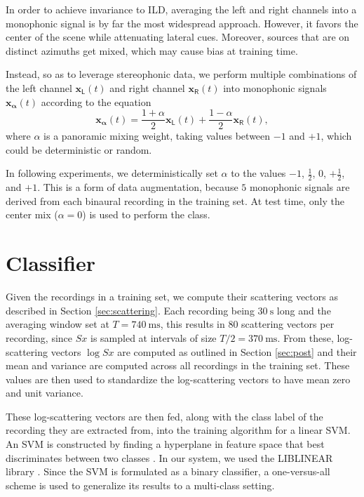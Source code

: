 \documentclass{article}
\begin{document}
\begin{sloppy}
In order to achieve invariance to ILD, averaging the left and right channels into a monophonic signal is by far the most widespread approach.
However, it favors the center of the scene while attenuating lateral cues.
Moreover, sources that are on distinct azimuths get mixed, which may cause bias at training time.

Instead, so as to leverage stereophonic data, we perform multiple combinations of the left channel $\boldsymbol{x_{\mathsf{L}}}(t)$ and right channel $\boldsymbol{x_{\mathsf{R}}}(t)$ into monophonic signals $\boldsymbol{x_{\alpha}}(t)$ according to the equation
\begin{equation}
\boldsymbol{x_{\alpha}}(t) =
\dfrac{1+\alpha}{2} \boldsymbol{x_\mathsf{L}}(t) +
\dfrac{1-\alpha}{2} \boldsymbol{x_\mathsf{R}}(t),
\end{equation}
where $\alpha$ is a panoramic mixing weight, taking values between $-1$ and $+1$, which could be deterministic or random.

In following experiments, we deterministically set $\alpha$ to the values $-1$, $\frac{1}{2}$, $0$, $+\frac{1}{2}$, and $+1$.
This is a form of data augmentation, because $5$ monophonic signals are derived from each binaural recording in the training set.
At test time, only the center mix ($\alpha = 0$) is used to perform the class.

\section{Classifier}
\label{sec:classifier}

Given the recordings in a training set, we compute their scattering vectors as described in Section \ref{sec:scattering}. Each recording being $30~\mathrm{s}$ long and the averaging window set at $T = 740~\mathrm{ms}$, this results in $80$ scattering vectors per recording, since $Sx$ is sampled at intervals of size $T/2 = 370~\mathrm{ms}$. From these, log-scattering vectors $\log Sx$ are computed as outlined in Section \ref{sec:post} and their mean and variance are computed across all recordings in the training set. These values are then used to standardize the log-scattering vectors to have mean zero and unit variance.

These log-scattering vectors are then fed, along with the class label of the recording they are extracted from, into the training algorithm for a linear SVM. An SVM is constructed by finding a hyperplane in feature space that best discriminates between two classes \cite{vapnik}. In our system, we used the LIBLINEAR library \cite{liblinear}. Since the SVM is formulated as a binary classifier, a one-versus-all scheme is used to generalize its results to a multi-class setting.


\end{sloppy}
\end{document}
